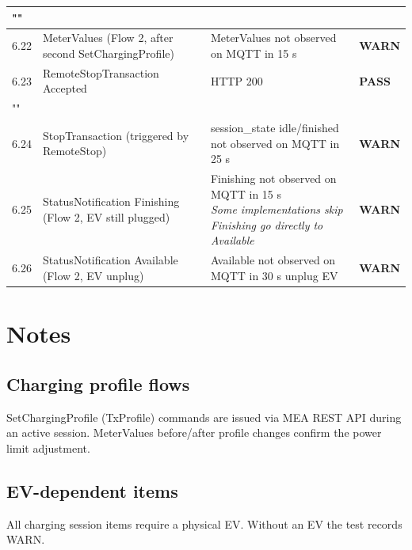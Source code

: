 \documentclass[10pt, a4paper]{article}
\begin{document}
\begin{longtable}{|L{1cm}|L{5.5cm}|M{7cm}|C{1.8cm}|}
\hline
{} \\
\hline
\small 6.22 & \small MeterValues (Flow 2, after second SetChargingProfile) & MeterValues not observed on MQTT in 15 s & \textcolor{warnorange}{\textbf{WARN}} \\
\hline
\small 6.23 & \small RemoteStopTransaction  Accepted & HTTP 200 & \textcolor{passgreen}{\textbf{PASS}} \\
\hline
{} \\
\hline
\small 6.24 & \small StopTransaction (triggered by RemoteStop) & session\_state idle/finished not observed on MQTT in 25 s & \textcolor{warnorange}{\textbf{WARN}} \\
\hline
\small 6.25 & \small StatusNotification Finishing (Flow 2, EV still plugged) & Finishing not observed on MQTT in 15 s{\newline\normalfont\footnotesize\itshape Some implementations skip Finishing  go directly to Available} & \textcolor{warnorange}{\textbf{WARN}} \\
\hline
\small 6.26 & \small StatusNotification Available (Flow 2, EV unplug) & Available not observed on MQTT in 30 s  unplug EV & \textcolor{warnorange}{\textbf{WARN}} \\
\hline
\end{longtable}
\normalsize

\section{Notes}

\subsection*{Charging profile flows}
SetChargingProfile (TxProfile) commands are issued via MEA REST API during an active session.
MeterValues before/after profile changes confirm the power limit adjustment.

\subsection*{EV-dependent items}
All charging session items require a physical EV. Without an EV the test records WARN.
\end{document}
